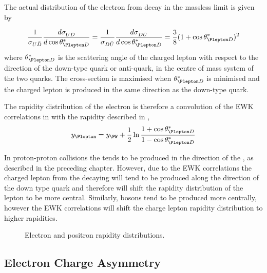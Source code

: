 The actual distribution of the electron from \PWpm decay in the massless limit
is given by\cite{} 

\begin{equation}
  \frac{1}{\sigma_{U\bar{D}}}
  \frac{d \sigma_{U\bar{D}}}{d \cos \theta_{\Plepton D}^{\ast}}
  =
  \frac{1}{\sigma_{D\bar{U}}}
  \frac{d \sigma_{D\bar{U}}}{d \cos \theta_{\Plepton D}^{\ast}}
  =
  \frac{3}{8}(1+\cos \theta_{\Plepton D}^{\ast})^2
  \label{wbos:lepton}
\end{equation}
where $\theta_{\Plepton D}^{\ast}$ is the scattering angle of the charged
lepton with respect to the direction of the down-type quark or anti-quark, in
the centre of mass system of the two quarks. The cross-section is maximised when
$\theta_{\Plepton D}^{\ast}$ is minimised and the charged lepton is produced in
the same direction as the down-type quark.

The rapidity distribution of the electron is therefore a convolution of the
\ac{EWK} correlations in  with the \PW rapidity
described in ,
\begin{equation}
  y_{\Plepton} = 
  y_{\PW} +
  \frac{1}{2}
  \ln
  \frac{1 + \cos \theta_{\Plepton D}^{\ast}}{1 - \cos \theta_{\Plepton D}^{\ast}}
  \label{wbos:leptonfull}
\end{equation}

In proton-proton collisions the \PWp tends to be produced in the direction
of the \Pup, as described in the preceding chapter.  
However, due to the EWK correlations the charged lepton from the decaying \PWp
will tend to be produced along the direction of the down type quark and
therefore will shift the rapidity distribution of the lepton to be more
central. Similarly, \PWm bosons tend to be produced more centrally, however the
EWK correlations will shift the charge lepton rapidity distribution to higher
rapidities.

\begin{figure}[htbp]
  \centering
  \caption{Electron and positron rapidity distributions.}
  \label{wbos:leptonrapidity}
\end{figure}

\subsection{Electron Charge Asymmetry}

